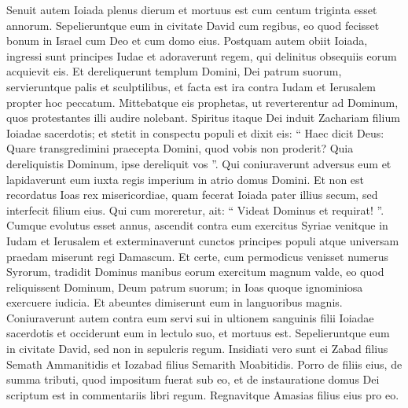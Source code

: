 \begin{biblechapter}
\begin{biblechapter}
\begin{biblechapter}
\begin{biblechapter}
\begin{biblechapter}
\begin{biblechapter}
\begin{biblechapter}
\begin{biblechapter}
\begin{biblechapter}
\begin{biblechapter}
\begin{biblechapter}
\begin{biblechapter}
\begin{biblechapter}
\begin{biblechapter}
\begin{biblechapter}
\begin{biblechapter}
\begin{biblechapter}
\begin{biblechapter}
\begin{biblechapter}
\begin{biblechapter}
\begin{biblechapter}
\begin{biblechapter}
\begin{biblechapter}
\begin{biblechapter}
 \verse Senuit autem Ioiada plenus dierum et mortuus est cum centum triginta esset annorum. 
\verse Sepelieruntque eum in civitate David cum regibus, eo quod fecisset bonum in Israel cum Deo et cum domo eius.
 \verse Postquam autem obiit Ioiada, ingressi sunt principes Iudae et adoraverunt regem, qui delinitus obsequiis eorum acquievit eis. 
\verse Et dereliquerunt templum Domini, Dei patrum suorum, servieruntque palis et sculptilibus, et facta est ira contra Iudam et Ierusalem propter hoc peccatum. 
\verse Mittebatque eis prophetas, ut reverterentur ad Dominum, quos protestantes illi audire nolebant.
 \verse Spiritus itaque Dei induit Zachariam filium Ioiadae sacerdotis; et stetit in conspectu populi et dixit eis: “ Haec dicit Deus: Quare transgredimini praecepta Domini, quod vobis non proderit? Quia dereliquistis Dominum, ipse dereliquit vos ”. 
\verse Qui coniuraverunt adversus eum et lapidaverunt eum iuxta regis imperium in atrio domus Domini. 
\verse Et non est recordatus Ioas rex misericordiae, quam fecerat Ioiada pater illius secum, sed interfecit filium eius. Qui cum moreretur, ait: “ Videat Dominus et requirat! ”.
 \verse Cumque evolutus esset annus, ascendit contra eum exercitus Syriae venitque in Iudam et Ierusalem et exterminaverunt cunctos principes populi atque universam praedam miserunt regi Damascum. 
\verse Et certe, cum permodicus venisset numerus Syrorum, tradidit Dominus manibus eorum exercitum magnum valde, eo quod reliquissent Dominum, Deum patrum suorum; in Ioas quoque ignominiosa exercuere iudicia. 
\verse Et abeuntes dimiserunt eum in languoribus magnis. Coniuraverunt autem contra eum servi sui in ultionem sanguinis filii Ioiadae sacerdotis et occiderunt eum in lectulo suo, et mortuus est. Sepelieruntque eum in civitate David, sed non in sepulcris regum. 
\verse Insidiati vero sunt ei Zabad filius Semath Ammanitidis et Iozabad filius Semarith Moabitidis.
 \verse Porro de filiis eius, de summa tributi, quod impositum fuerat sub eo, et de instauratione domus Dei scriptum est in commentariis libri regum. Regnavitque Amasias filius eius pro eo.
 

\end{biblechapter}
\end{biblechapter}
\end{biblechapter}
\end{biblechapter}
\end{biblechapter}
\end{biblechapter}
\end{biblechapter}
\end{biblechapter}
\end{biblechapter}
\end{biblechapter}
\end{biblechapter}
\end{biblechapter}
\end{biblechapter}
\end{biblechapter}
\end{biblechapter}
\end{biblechapter}
\end{biblechapter}
\end{biblechapter}
\end{biblechapter}
\end{biblechapter}
\end{biblechapter}
\end{biblechapter}
\end{biblechapter}
\end{biblechapter}
